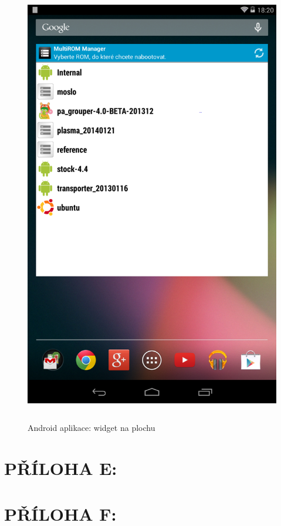 \documentclass[12pt, a4paper, oneside]{article}
\begin{document}
\begin{figure}[H]
\begin{center}
 \includegraphics[height=550pt]{img/app_widget.png}
\caption{Android aplikace: widget na plochu}
\end{center}
\end{figure}

\newpage
\section*{PŘÍLOHA E:}
\printbibliography

\newpage
\section*{PŘÍLOHA F:}
~
\listoffigures
\end{document}
